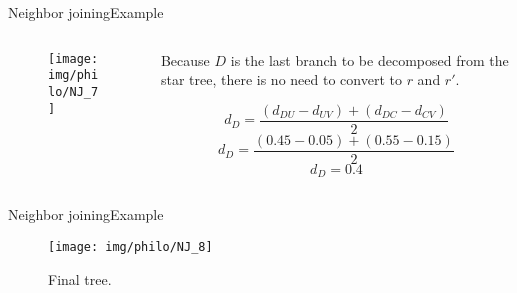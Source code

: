 \documentclass[10pt]{beamer}
\newcommand{\1}{
	\setbeamertemplate{background}{
		\texttt{[image: img/1]}
		\tikz[overlay] \fill[fill opacity=0.75,fill=white] (0,0) rectangle (-\paperwidth,\paperheight);
	}
}
\begin{document}
\begin{frame}{Neighbor joining}{Example}	
	\begin{columns}
		\begin{column}{0.48\textwidth}
			\begin{figure}
				\texttt{[image: img/philo/NJ\_7]}
			\end{figure}
		\end{column}
		\begin{column}{0.48\textwidth}
			 Because $D$ is the last branch to be decomposed from the star tree, there is no need to convert to $r$ and $r'$.
			 
			\begin{equation*}		
			d_D = \frac{(d_{DU} - d_{UV} ) + (d_{DC} - d_{CV} )}{2} 	
			\end{equation*} 
			\begin{equation*}	
			d_D = \frac{(0.45 - 0.05) + (0.55 - 0.15)}{2}
			\end{equation*}
			\begin{equation*}	
			d_D = 0.4		
			\end{equation*} 
		\end{column}
	\end{columns}
\end{frame}

\begin{frame}{Neighbor joining}{Example}	
	\begin{figure}
		\texttt{[image: img/philo/NJ\_8]}
		\caption{Final tree.}
	\end{figure}
\end{frame}
\end{document}
